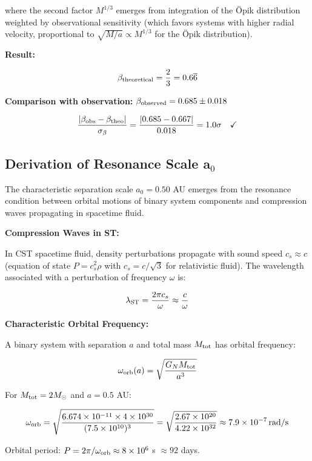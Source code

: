 \documentclass[11pt,a4paper]{article}
\begin{document}
where the second factor \(M^{1/3}\) emerges from integration of the {\"{O}}pik
distribution weighted by observational sensitivity (which favors systems
with higher radial velocity, proportional to
\(\sqrt{M/a} \propto M^{1/3}\) for the {\"{O}}pik distribution).

\textbf{Result:}

\[\beta_{\rm theoretical} = \frac{2}{3} = 0.6\overline{6}\]

\textbf{Comparison with observation:}
\(\beta_{\rm observed} = 0.685 \pm 0.018\)

\[\frac{|\beta_{\rm obs} - \beta_{\rm theo}|}{\sigma_\beta} = \frac{|0.685 - 0.667|}{0.018} = 1.0\sigma \quad \checkmark\]

\hypertarget{a.2-derivation-of-resonance-scale-aux2080}{%
\subsection*{Derivation of Resonance Scale
a$_{0}$}\label{a.2-derivation-of-resonance-scale-aux2080}}

The characteristic separation scale \(a_0 = 0.50\) AU emerges from the
resonance condition between orbital motions of binary system components
and compression waves propagating in spacetime fluid.

\textbf{Compression Waves in ST:}

In CST spacetime fluid, density perturbations propagate with sound speed
\(c_s \approx c\) (equation of state \(P = c_s^2\rho\) with
\(c_s = c/\sqrt{3}\) for relativistic fluid). The wavelength associated
with a perturbation of frequency \(\omega\) is:

\[\lambda_{\rm ST} = \frac{2\pi c_s}{\omega} \approx \frac{c}{\omega}\]

\textbf{Characteristic Orbital Frequency:}

A binary system with separation \(a\) and total mass \(M_{\rm tot}\) has
orbital frequency:

\[\omega_{\rm orb}(a) = \sqrt{\frac{G_N M_{\rm tot}}{a^3}}\]

For \(M_{\rm tot} = 2 M_\odot\) and \(a = 0.5\) AU:

\[\omega_{\rm orb} = \sqrt{\frac{6.674\times10^{-11} \times 4\times10^{30}}{(7.5\times10^{10})^3}} = \sqrt{\frac{2.67\times10^{20}}{4.22\times10^{32}}} \approx 7.9\times10^{-7}\,\mathrm{rad/s}\]

Orbital period: \(P = 2\pi/\omega_{\rm orb} \approx 8\times10^6\) s
\(\approx 92\) days.
\end{document}
